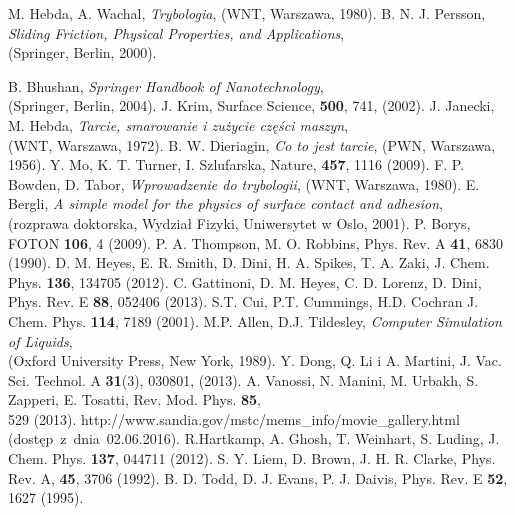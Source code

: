 \begin{thebibliography}{3}
%
\begin{spacing}{1.0}
 M. Hebda, A. Wachal, {\it Trybologia}, (WNT, Warszawa, 1980).
 B. N. J. Persson, {\it Sliding Friction, Physical Properties, and Applications}, \\(Springer, Berlin, 2000).

 B. Bhushan, {\it Springer Handbook of Nanotechnology}, \\(Springer, Berlin, 2004).
 J. Krim, Surface Science, {\bf 500}, 741, (2002).
 J. Janecki, M. Hebda, {\it Tarcie, smarowanie i zużycie części maszyn}, \\(WNT, Warszawa, 1972).
 B. W. Dieriagin, {\it Co to jest tarcie}, (PWN, Warszawa, 1956). 
 Y. Mo, K. T. Turner, I. Szlufarska, Nature, {\bf 457}, 1116 (2009).
 F. P. Bowden, D. Tabor, {\it Wprowadzenie do trybologii}, (WNT, Warszawa, 1980).
 E. Bergli, {\it A simple model for the physics of surface contact and adhesion}, \\(rozprawa doktorska, Wydział Fizyki, Uniwersytet w Oslo, 2001).
 P. Borys, FOTON {\bf 106}, 4 (2009).
 P. A. Thompson, M. O. Robbins, Phys. Rev. A {\bf 41}, 6830 (1990).
 D. M. Heyes, E. R. Smith, D. Dini, H. A. Spikes, T. A. Zaki, J. Chem. Phys. {\bf 136}, 134705 (2012).
 C. Gattinoni, D. M. Heyes, C. D. Lorenz, D. Dini, Phys. Rev. E {\bf 88}, 052406 (2013).
 S.T. Cui, P.T. Cummings, H.D. Cochran J. Chem. Phys. {\bf 114}, 7189 (2001).
 M.P. Allen, D.J. Tildesley, {\it Computer Simulation of Liquids}, \\(Oxford University Press, New York, 1989).
 Y. Dong, Q. Li i A. Martini, J. Vac. Sci. Technol. A {\bf 31}(3), 030801, (2013).
 A. Vanossi, N. Manini, M. Urbakh, S. Zapperi, E. Tosatti, Rev. Mod. Phys.  {\bf 85}, \\529 (2013).
 http://www.sandia.gov/mstc/mems\_info/movie\_gallery.html \\ (dostęp~z~dnia~02.06.2016).
 R.Hartkamp, A. Ghosh, T. Weinhart, S. Luding, J. Chem. Phys. {\bf 137}, 044711 (2012).
 S. Y. Liem, D. Brown, J. H. R. Clarke, Phys. Rev. A, {\bf 45}, 3706 (1992).
 B. D. Todd, D. J. Evans, P. J. Daivis, Phys. Rev. E {\bf 52}, 1627 (1995).

\end{spacing}
\end{thebibliography}
